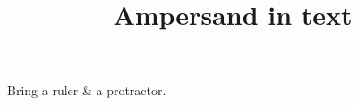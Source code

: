 \documentclass{handout}
\title{Ampersand in text}
\begin{document}
\maketitle
Bring a ruler & a protractor.
\end{document}
